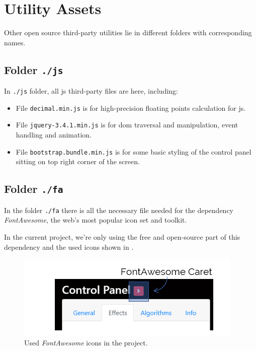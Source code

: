 
\section{Utility Assets}

Other open source third-party utilities lie in different folders with corresponding names.

\subsection{Folder \texttt{./js}}

In \texttt{./js} folder, all \gls{js} third-party files are here, including:

\begin{itemize}
    \item File \texttt{decimal.min.js} is for high-precision floating points calculation for \gls{js}.
    \item File \texttt{jquery-3.4.1.min.js} is for \gls{dom} traversal and manipulation, event handling and animation.
    \item File \texttt{bootstrap.bundle.min.js} is for some basic styling of the control panel sitting on top right corner of the screen.
\end{itemize}

\subsection{Folder \texttt{./fa}}

In the folder \texttt{./fa} there is all the necessary file needed for the dependency \emph{FontAwesome}, the web's most popular icon set and toolkit.

In the current project, we're only using the free and open-source part of this dependency and the used icons shown in .

\begin{figure}[H]
\centering
\includegraphics[width=.5\textwidth,keepaspectratio]{Figures/Chapter4/fa.png}
\decoRule
\caption[FontAwesome Icons]{Used \emph{FontAwesome} icons in the project.}
\label{fig:fa}
\end{figure}

